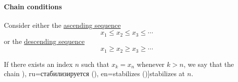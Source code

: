 \paragraph{Chain conditions}

\begin{definition}\label{def:stabilizing_sequence}\mimprovised
  Consider either the \hyperref[def:order_function/preserving]{ascending sequence}
  \begin{equation*}
    x_1 \leq x_2 \leq x_3 \leq \cdots
  \end{equation*}
  or the \hyperref[def:order_function/reversing]{descending sequence}
  \begin{equation*}
    x_1 \geq x_2 \geq x_3 \geq \cdots
  \end{equation*}

  If there exists an index \( n \) such that \( x_k = x_n \) whenever \( k > n \), we say that the chain \term[bg=стабилизира (\cite[41]{КоцевСидеров2016КомутативнаАлгебра}), ru=стабилизируется (\cite[52]{Яблонский2003ДискретнаяМатематика}), en=stabilizes (\cite[244]{Aluffi2009Algebra})]{stabilizes} at \( n \).
\end{definition}

